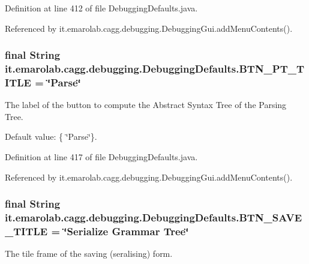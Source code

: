 Definition at line 412 of file Debugging\-Defaults.\-java.



Referenced by it.\-emarolab.\-cagg.\-debugging.\-Debugging\-Gui.\-add\-Menu\-Contents().

\hypertarget{classit_1_1emarolab_1_1cagg_1_1debugging_1_1DebuggingDefaults_acf68afb85989e9a4ee388c5ce524a8d4}{
\subsubsection[{B\-T\-N\-\_\-\-P\-T\-\_\-\-T\-I\-T\-L\-E}]{\setlength{\rightskip}{0pt plus 5cm}final String it.\-emarolab.\-cagg.\-debugging.\-Debugging\-Defaults.\-B\-T\-N\-\_\-\-P\-T\-\_\-\-T\-I\-T\-L\-E = \char`\"{}Parse\char`\"{}\hspace{0.3cm}{\ttfamily [static]}}}\label{classit_1_1emarolab_1_1cagg_1_1debugging_1_1DebuggingDefaults_acf68afb85989e9a4ee388c5ce524a8d4}
The label of the button to compute the Abstract Syntax Tree of the Parsing Tree. \par
 Default value\-: \{ \char`\"{}\-Parse\char`\"{}\}. 

Definition at line 417 of file Debugging\-Defaults.\-java.



Referenced by it.\-emarolab.\-cagg.\-debugging.\-Debugging\-Gui.\-add\-Menu\-Contents().

\hypertarget{classit_1_1emarolab_1_1cagg_1_1debugging_1_1DebuggingDefaults_a0464e2088444b5e75d9a7f0973598de2}{
\subsubsection[{B\-T\-N\-\_\-\-S\-A\-V\-E\-\_\-\-T\-I\-T\-L\-E}]{\setlength{\rightskip}{0pt plus 5cm}final String it.\-emarolab.\-cagg.\-debugging.\-Debugging\-Defaults.\-B\-T\-N\-\_\-\-S\-A\-V\-E\-\_\-\-T\-I\-T\-L\-E = \char`\"{}Serialize Grammar Tree\char`\"{}\hspace{0.3cm}{\ttfamily [static]}}}\label{classit_1_1emarolab_1_1cagg_1_1debugging_1_1DebuggingDefaults_a0464e2088444b5e75d9a7f0973598de2}
The tile frame of the saving (seralising) form. 

